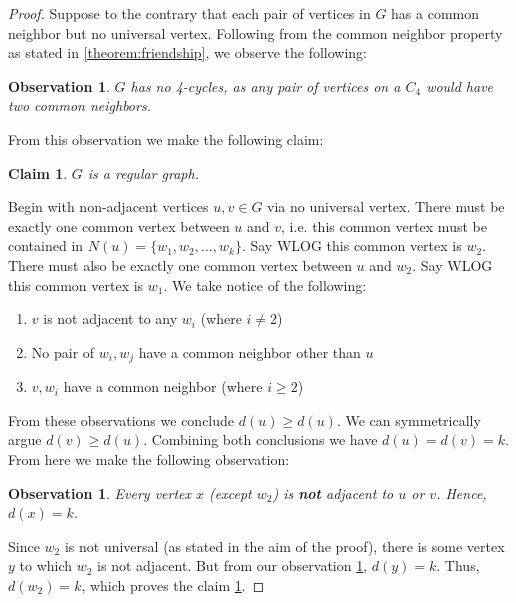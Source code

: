 \documentclass{article}
\newtheorem{observation}[theorem]{Observation}
\newtheorem{claim}[theorem]{Claim}
\begin{document}
\begin{proof}
\label{proof:friendship_theorem}
Suppose to the contrary that each pair of vertices in $G$ has a common neighbor but no universal vertex. Following from the common neighbor property as stated in \ref{theorem:friendship}, we observe the following:

\begin{observation}
$G$ has no 4-cycles, as any pair of vertices on a $C_4$ would have two common neighbors. 
\end{observation}

From this observation we make the following claim:

\begin{claim}
\label{claim:regularity}
$G$ is a regular graph.
\end{claim}

Begin with non-adjacent vertices $u, v \in G$ via no universal vertex. There must be exactly one common vertex between $u$ and $v$, i.e. this common vertex must be contained in $N(u) = \{w_1, w_2, ... , w_k\}$. Say WLOG this common vertex is $w_2$. There must also be exactly one common vertex between $u$ and $w_2$. Say WLOG this common vertex is $w_1$. We take notice of the following:

\begin{enumerate}
    \item $v$ is not adjacent to any $w_i$ (where $i \neq 2$)
    \item No pair of $w_i, w_j$ have a common neighbor other than $u$
    \item $v, w_i$ have a common neighbor (where $ i \geq 2$)
\end{enumerate}

From these observations we conclude $d(u) \geq d(u)$. We can symmetrically argue $d(v) \geq d(u)$. Combining both conclusions we have $d(u) = d(v) = k$. From here we make the following observation:

\begin{observation}
\label{obs:adjacency}
Every vertex $x$ (except $w_2$) is \textbf{not} adjacent to $u$ or $v$. Hence, $d(x) = k$.
\end{observation}  

Since $w_2$ is not universal (as stated in the aim of the proof), there is some vertex $y$ to which $w_2$ is not adjacent. But from our observation \ref{obs:adjacency}, $d(y) = k$. Thus, $d(w_2) = k$, which proves the claim \ref{claim:regularity}. 

\bigskip


\end{proof}
\end{document}

